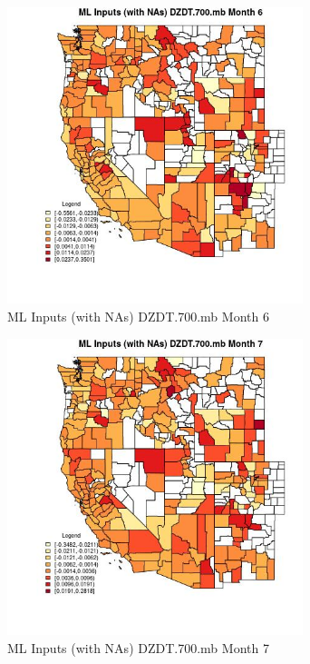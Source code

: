 \begin{figure} 
\centering  
\includegraphics[width=0.77\textwidth]{Code_Outputs/Report_ML_input_PM25_Step4_part_f_de_duplicated_aves_prioritize_24hr_obswNAs_CountyDZDT700mbmedianMonth6.jpg} 
\caption{\label{fig:Report_ML_input_PM25_Step4_part_f_de_duplicated_aves_prioritize_24hr_obswNAsCountyDZDT700mbmedianMonth6}ML Inputs (with NAs) DZDT.700.mb Month 6} 
\end{figure} 
 

\begin{figure} 
\centering  
\includegraphics[width=0.77\textwidth]{Code_Outputs/Report_ML_input_PM25_Step4_part_f_de_duplicated_aves_prioritize_24hr_obswNAs_CountyDZDT700mbmedianMonth7.jpg} 
\caption{\label{fig:Report_ML_input_PM25_Step4_part_f_de_duplicated_aves_prioritize_24hr_obswNAsCountyDZDT700mbmedianMonth7}ML Inputs (with NAs) DZDT.700.mb Month 7} 
\end{figure} 
 

